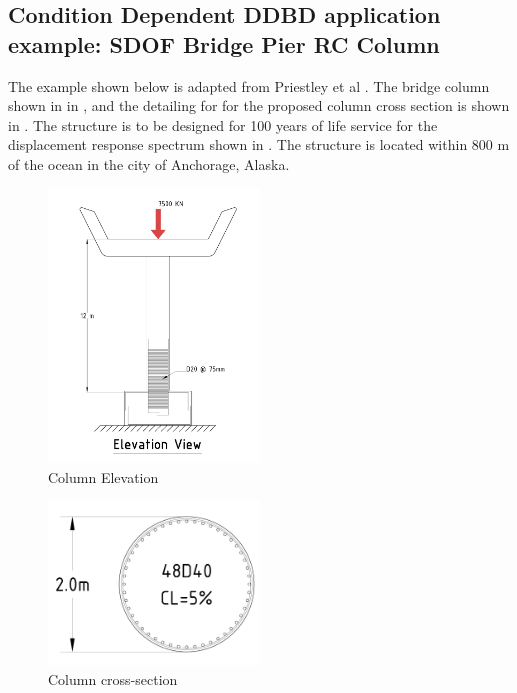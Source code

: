 \subsection{Condition Dependent DDBD application example: SDOF Bridge Pier RC Column}

The example shown below is adapted from Priestley et al \cites{Priestley2007}. The bridge column shown in in , and the detailing for for the proposed column cross section is shown in . The structure is to be designed for 100 years of life service for the displacement response spectrum shown in . The structure is located within 800 m of the ocean in the city of Anchorage, Alaska.

\begin{figure}[htbp]
	\centering
	\includegraphics[width=0.5\textwidth]{VAC Thesis 2.0/Chapter-6/figs/Column_Elevation.pdf}
	\caption{Column Elevation}
	\label{fig:column_elevation_design}
\end{figure}

\begin{figure}[htbp]
	\centering
	\includegraphics[width=0.5\textwidth]{VAC Thesis 2.0/Chapter-6/figs/ColumnSection_Design.pdf}
	\caption{Column cross-section}
	\label{fig:column_cross-section_design}
\end{figure}

